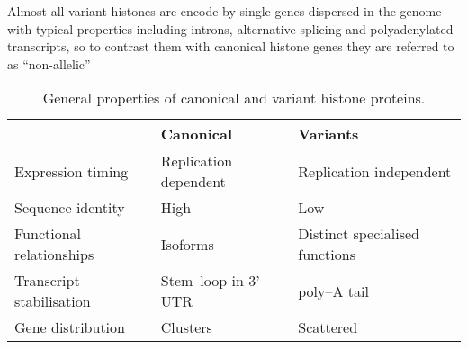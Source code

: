   
  Almost all variant histones are encode by single genes dispersed in the genome 
  with typical properties including introns, alternative splicing and polyadenylated transcripts, 
  so to contrast them with canonical histone genes they are referred to as ``non-allelic''
  


  \begin{table*}
    \caption{General properties of canonical and variant histone proteins.}
    \label{tab:typical-histone-differences}
    \centering
    \begin{tabular}{l l l}
      \toprule
      \null                     & Canonical             & Variants \\
      \midrule
      Expression timing         & Replication dependent & Replication independent \\
      Sequence identity         & High                  & Low \\
      Functional relationships  & Isoforms              & Distinct specialised functions \\
      Transcript stabilisation  & Stem--loop in 3' UTR  & poly--A tail \\
      Gene distribution         & Clusters              & Scattered \\
      \bottomrule
    \end{tabular}
  \end{table*}


